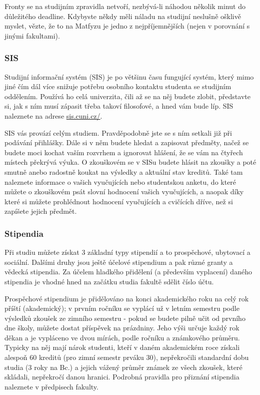 Fronty se na studijním zpravidla netvoří, nezbývá-li náhodou několik minut do důležitého deadline. Kdybyste někdy měli náladu na studijní neslušně ošklivě myslet, vězte, že to na Matfyzu je jedno z nejpříjemnějších (nejen v porovnání s jinými fakultami).


\subsubsection{SIS}
Studijní informační systém (SIS) je po většinu času fungující systém, který mimo jiné čím dál více snižuje potřebu osobního kontaktu studenta se studijním oddělením. Používá ho celá univerzita, čili až se na něj budete zlobit, představte si, jak s ním musí zápasit třeba takoví filosofové, a hned vám bude líp. SIS naleznete na adrese \url{sis.cuni.cz/}.

SIS vás provází celým studiem. Pravděpodobně jste se s ním setkali již při podávání přihlášky. Dále si v něm budete hledat a zapisovat předměty, načež se budete moci kochat vaším rozvrhem a ignorovat hlášení, že se vám na čtyřech místech překrývá výuka. O zkouškovém se v SISu budete hlásit na zkoušky a poté smutně anebo radostně koukat na výsledky a aktuální stav kreditů. Také tam naleznete informace o vašich vyučujících nebo studentskou anketu, do které můžete o zkouškovém psát slovní hodnocení vašich vyučujících, a naopak díky které si můžete prohlédnout hodnocení vyučujících a cvičících dříve, než si zapíšete jejich předmět.

\subsubsection{Stipendia}
Při studiu můžete získat 3 základní typy stipendií a to prospěchové, ubytovací a sociální. Dalšími druhy jsou ještě účelové stipendium a pak různé granty a vědecká stipendia. Za účelem hladkého přidělení (a především vyplacení) daného stipendia je vhodné hned na začátku studia fakultě sdělit číslo účtu.

Prospěchové stipendium je přidělováno na konci akademického roku na celý rok příští (akademický); v prvním ročníku se vyplácí už v letním semestru podle výsledků zkoušek ze zimního semestru - pokud se budete pilně učit od prvního dne školy, můžete dostat příspěvek na prázdniny. Jeho výši určuje každý rok děkan a je vypláceno ve dvou mírách, podle ročníku a známkového průměru. Typicky na něj mají nárok studenti, kteří v daném akademickém roce získali alespoň 60 kreditů (pro zimní semestr prváku 30), nepřekročili standardní dobu studia (3 roky na Bc.) a jejich vážený průměr známek ze všech zkoušek, které skládali, nepřekročí danou hranici. Podrobná pravidla pro přiznání stipendia naleznete v předpisech fakulty.

